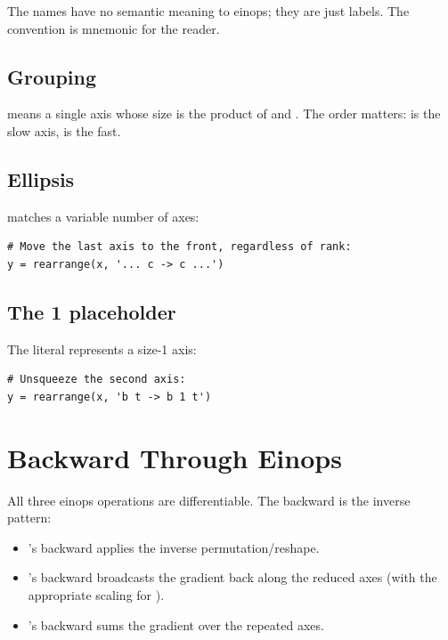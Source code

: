 The names have no semantic meaning to einops; they are just
labels. The convention is mnemonic for the reader.

\subsection{Grouping}
\label{ssec:einops:grouping}

 means a single axis whose size is the product of
 and . The order matters:  is the slow
axis,  is the fast.

\subsection{Ellipsis}
\label{ssec:einops:ellipsis}

 matches a variable number of axes:

\begin{lstlisting}[style=lucid,language=LucidPython]
# Move the last axis to the front, regardless of rank:
y = rearrange(x, '... c -> c ...')
\end{lstlisting}

\subsection{The 1 placeholder}
\label{ssec:einops:one_placeholder}

The literal  represents a size-1 axis:

\begin{lstlisting}[style=lucid,language=LucidPython]
# Unsqueeze the second axis:
y = rearrange(x, 'b t -> b 1 t')
\end{lstlisting}

\section{Backward Through Einops}
\label{sec:einops:backward}

All three einops operations are differentiable. The backward is
the inverse pattern:

\begin{itemize}
  \item {}'s backward applies the inverse
    permutation/reshape.
  \item {}'s backward broadcasts the gradient back
    along the reduced axes (with the appropriate scaling for
    ).
  \item {}'s backward sums the gradient over the
    repeated axes.
\end{itemize}

